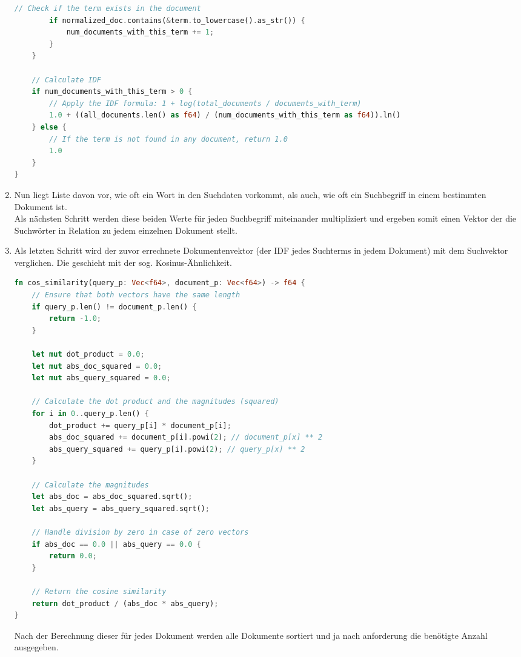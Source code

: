 \begin{enumerate}
\begin{lstlisting}[language=Rust]
        // Check if the term exists in the document
        if normalized_doc.contains(&term.to_lowercase().as_str()) {
            num_documents_with_this_term += 1;
        }
    }

    // Calculate IDF
    if num_documents_with_this_term > 0 {
        // Apply the IDF formula: 1 + log(total_documents / documents_with_term)
        1.0 + ((all_documents.len() as f64) / (num_documents_with_this_term as f64)).ln()
    } else {
        // If the term is not found in any document, return 1.0
        1.0
    }
}
\end{lstlisting}

    \item Nun liegt Liste davon vor, wie oft ein Wort in den Suchdaten vorkommt, als auch, wie oft ein Suchbegriff in einem bestimmten Dokument ist. \\ Als nächsten Schritt werden diese beiden Werte für jeden Suchbegriff miteinander multipliziert und ergeben somit einen Vektor der die Suchwörter in Relation zu jedem einzelnen Dokument stellt.
    \item Als letzten Schritt wird der zuvor errechnete Dokumentenvektor (der IDF jedes Suchterms in jedem Dokument) mit dem Suchvektor verglichen. Die geschieht mit der sog. Kosinus-Ähnlichkeit.
    \begin{lstlisting}[language=Rust]
fn cos_similarity(query_p: Vec<f64>, document_p: Vec<f64>) -> f64 {
    // Ensure that both vectors have the same length
    if query_p.len() != document_p.len() {
        return -1.0;
    }

    let mut dot_product = 0.0;
    let mut abs_doc_squared = 0.0;
    let mut abs_query_squared = 0.0;

    // Calculate the dot product and the magnitudes (squared)
    for i in 0..query_p.len() {
        dot_product += query_p[i] * document_p[i];
        abs_doc_squared += document_p[i].powi(2); // document_p[x] ** 2
        abs_query_squared += query_p[i].powi(2); // query_p[x] ** 2
    }

    // Calculate the magnitudes
    let abs_doc = abs_doc_squared.sqrt();
    let abs_query = abs_query_squared.sqrt();

    // Handle division by zero in case of zero vectors
    if abs_doc == 0.0 || abs_query == 0.0 {
        return 0.0;
    }

    // Return the cosine similarity
    return dot_product / (abs_doc * abs_query);
}\end{lstlisting}
    Nach der Berechnung dieser für jedes Dokument werden alle Dokumente sortiert und ja nach anforderung die benötigte Anzahl ausgegeben.
\end{enumerate}



